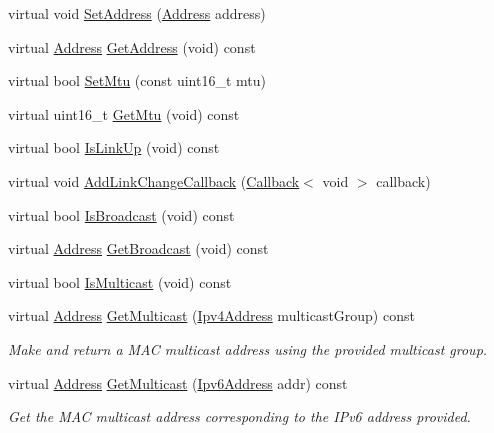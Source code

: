 \begin{DoxyCompactItemize}
\item 
virtual void \hyperlink{classns3_1_1LrWpanNetDevice_a2bfd297525ee660649b3c66751754355}{Set\+Address} (\hyperlink{classns3_1_1Address}{Address} address)
\item 
virtual \hyperlink{classns3_1_1Address}{Address} \hyperlink{classns3_1_1LrWpanNetDevice_aa0ad6287e125cc68124400dfab0bf23a}{Get\+Address} (void) const 
\item 
virtual bool \hyperlink{classns3_1_1LrWpanNetDevice_a07f1a3ec2a24d7b5270713969e02f2ef}{Set\+Mtu} (const uint16\+\_\+t mtu)
\item 
virtual uint16\+\_\+t \hyperlink{classns3_1_1LrWpanNetDevice_a05677f10efdce98dbb51da4295a2dc95}{Get\+Mtu} (void) const 
\item 
virtual bool \hyperlink{classns3_1_1LrWpanNetDevice_adcf15d6acfe8a7c209022c0146cb712b}{Is\+Link\+Up} (void) const 
\item 
virtual void \hyperlink{classns3_1_1LrWpanNetDevice_a04bb26b1133de236bc1b13d2f0812f48}{Add\+Link\+Change\+Callback} (\hyperlink{classns3_1_1Callback}{Callback}$<$ void $>$ callback)
\item 
virtual bool \hyperlink{classns3_1_1LrWpanNetDevice_a3c3fc4ff3b5ac68b25b6fc8faa73b439}{Is\+Broadcast} (void) const 
\item 
virtual \hyperlink{classns3_1_1Address}{Address} \hyperlink{classns3_1_1LrWpanNetDevice_aafb01e173a1f33eddd3a97a776a64663}{Get\+Broadcast} (void) const 
\item 
virtual bool \hyperlink{classns3_1_1LrWpanNetDevice_a04a3cd380eadd9e3ee585cebc562d706}{Is\+Multicast} (void) const 
\item 
virtual \hyperlink{classns3_1_1Address}{Address} \hyperlink{classns3_1_1LrWpanNetDevice_a564f4c032384693fb920e3ce81b8da55}{Get\+Multicast} (\hyperlink{classns3_1_1Ipv4Address}{Ipv4\+Address} multicast\+Group) const 
\begin{DoxyCompactList}\small\item\em Make and return a M\+AC multicast address using the provided multicast group. \end{DoxyCompactList}\item 
virtual \hyperlink{classns3_1_1Address}{Address} \hyperlink{classns3_1_1LrWpanNetDevice_a3ff7d4252aa49a3cdd94a2b628bc32bc}{Get\+Multicast} (\hyperlink{classns3_1_1Ipv6Address}{Ipv6\+Address} addr) const 
\begin{DoxyCompactList}\small\item\em Get the M\+AC multicast address corresponding to the I\+Pv6 address provided. \end{DoxyCompactList}\item 

\end{DoxyCompactItemize}
